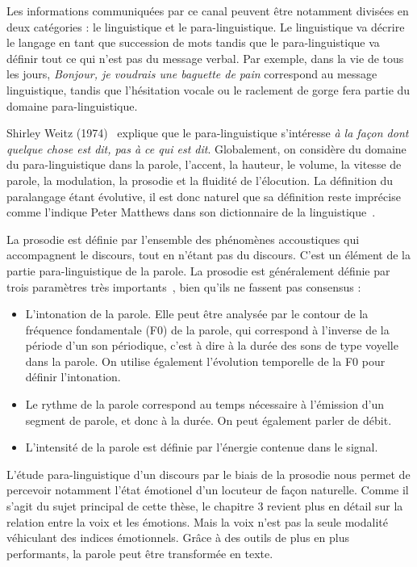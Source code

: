 Les informations communiquées par ce canal peuvent être notamment divisées en deux catégories : le linguistique et le para-linguistique.
Le linguistique va décrire le langage en tant que succession de mots tandis que le para-linguistique va définir tout ce qui n'est pas du message verbal. Par exemple, dans la vie de tous les jours, \textit{Bonjour, je voudrais une baguette de pain} correspond au message linguistique, tandis que l'hésitation vocale ou le raclement de gorge fera partie du domaine para-linguistique.

Shirley Weitz (1974)~\cite{Weitz1974} explique que le para-linguistique s'intéresse \textit{à la façon dont quelque chose est dit, pas à ce qui est dit}. Globalement, on considère du domaine du para-linguistique dans la parole, l'accent, la hauteur, le volume, la vitesse de parole, la modulation, la prosodie et la fluidité de l'élocution.
La définition du paralangage étant évolutive, il est donc naturel que sa définition reste imprécise comme l'indique Peter Matthews dans son dictionnaire de la linguistique~\cite{Matthews2014}.

La prosodie est définie par l'ensemble des phénomènes accoustiques qui accompagnent le discours, tout en n'étant pas du discours. C'est un élément de la partie para-linguistique de la parole. La prosodie est généralement définie par trois paramètres très importants~\cite{Srinivasan2003,Dohen2004}, bien qu'ils ne fassent pas consensus :
\begin{itemize}
  \item L'intonation de la parole. Elle peut être analysée par le contour de la fréquence fondamentale (F0) de la parole, qui correspond à l'inverse de la période d'un son périodique, c'est à dire à la durée des sons de type voyelle dans la parole. On utilise également l'évolution temporelle de la F0 pour définir l'intonation.
  \item Le rythme de la parole correspond au temps nécessaire à l'émission d'un segment de parole, et donc à la durée. On peut également parler de débit.
  \item L'intensité de la parole est définie par l'énergie contenue dans le signal.
\end{itemize}
L'étude para-linguistique d'un discours par le biais de la prosodie nous permet de percevoir notamment l'état émotionel d'un locuteur de façon naturelle. Comme il s'agit du sujet principal de cette thèse, le chapitre 3 revient plus en détail sur la relation entre la voix et les émotions. Mais la voix n'est pas la seule modalité véhiculant des indices émotionnels. Grâce à des outils de plus en plus performants, la parole peut être transformée en texte.

